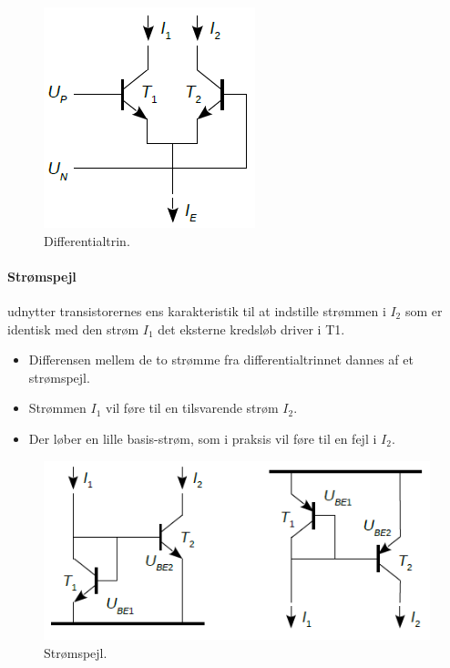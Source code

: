 \documentclass[danish]{article}
\begin{document}
\begin{figure} [H]
	\centering
	\includegraphics[width=0.3\linewidth]{graphics/differentialtrin}
	\caption{Differentialtrin.}
	\label{fig:differentialtrin}
\end{figure}
	
\paragraph{Strømspejl} udnytter transistorernes ens karakteristik til at indstille strømmen i $I_2$ som er identisk med den strøm $I_1$ det eksterne kredsløb driver i T1.
\begin{itemize}
	\item Differensen mellem de to strømme fra differentialtrinnet dannes af et strømspejl.
	\item Strømmen $I_1$ vil føre til en tilsvarende strøm $I_2$.
	\item Der løber en lille basis-strøm, som i praksis vil føre til en fejl i $I_2$.
\end{itemize}

\begin{figure} [H]
	\centering
	\includegraphics[width=0.6\linewidth]{graphics/currentmirror}
	\caption{Strømspejl.}
	\label{fig:currentmirror1}
\end{figure}

\newpage
\end{document}
